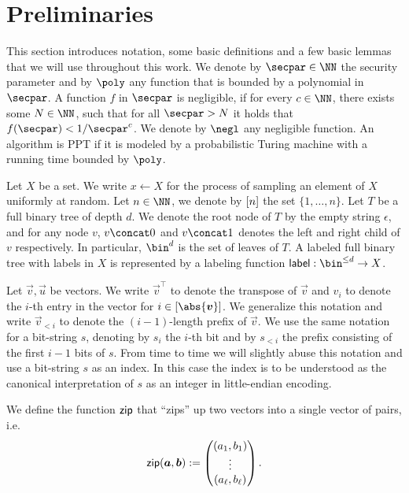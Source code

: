 \section{Preliminaries}\label{sec:prelim}
This section introduces notation, some basic definitions and a few basic lemmas that we will use throughout this work.
We denote by $\secpar\in\NN$ the security parameter and by $\poly$ any function that is bounded by a polynomial in $\secpar$.
A function $f$ in $\secpar$ is negligible, if for every $c \in \NN$, there exists some $N\in\NN$, such that for all $\secpar>N$ it holds that $f(\secpar) < 1/\secpar^c$.
We denote by $\negl$ any negligible function.
An algorithm is PPT if it is modeled by a probabilistic Turing machine with a running time bounded by $\poly$.

Let $X$ be a set.
We write $x\gets X$ for the process of sampling an element of $X$ uniformly at random.
Let $n\in\NN$, we denote by $[n]$ the set $\{1,\dots,n\}$.
Let $T$ be a full binary tree of depth $d$.
We denote the root node of $T$ by the empty string $\epsilon$, and for any node $v$, $v\concat 0$ and $v\concat 1$ denotes the left and right child of $v$ respectively.
In particular, $\bin^d$ is the set of leaves of $T$.
A labeled full binary tree with labels in $X$ is represented by a labeling function $\lbl : \bin^{\leq d} \to X$.

Let $\vec{v},\vec{u}$ be vectors.
We write $\vec{v}^\intercal$ to denote the transpose of $\vec{v}$ and $v_i$ to denote the $i$-th entry in the vector for $i\in[\abs{\vec{v}}]$.
We generalize this notation and write $\vec{v}_{< i}$ to denote the $(i-1)$-length prefix of $\vec{v}$.
We use the same notation for a bit-string $s$, denoting by $s_i$ the $i$-th bit and by $s_{<i}$ the prefix consisting of the first $i-1$ bits of $s$.
From time to time we will slightly abuse this notation and use a bit-string $s$ as an index.
In this case the index is to be understood as the canonical interpretation of $s$ as an integer in little-endian encoding.

We define the function $\mathsf{zip}$ that \enquote{zips} up two vectors into a single vector of pairs, i.e.
\[\mathsf{zip}(\boldsymbol{a},\boldsymbol{b}) := \begin{pmatrix}(a_1,b_1)\\
\vdots\\
(a_\ell,b_\ell) \end{pmatrix}.\]

